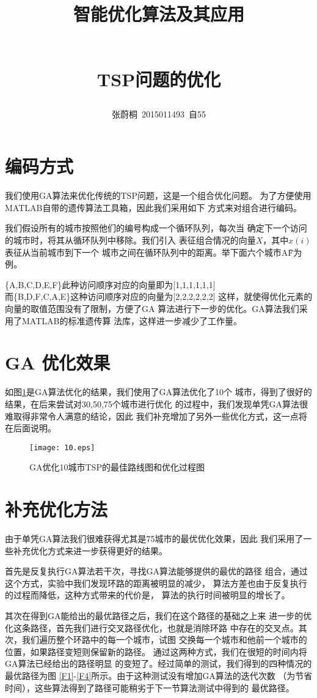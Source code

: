\documentclass[UTF8,a4paper]{paper}
\title{\begin{large} 智能优化算法及其应用\end{large}
\\ TSP问题的优化}
\author{张蔚桐\ 2015011493\ 自55}
\begin{document}
\maketitle
\section{编码方式}
我们使用GA算法来优化传统的TSP问题，这是一个组合优化问题。
为了方便使用MATLAB自带的遗传算法工具箱，因此我们采用如下
方式来对组合进行编码。

我们假设所有的城市按照他们的编号构成一个循环队列，每次当
确定下一个访问的城市时，将其从循环队列中移除。我们引入
表征组合情况的向量$X$，其中$x(i)$表征从当前城市到下一个
城市之间在循环队列中的距离。举下面六个城市A\~F为例。

\{A,B,C,D,E,F\}此种访问顺序对应的向量即为[1,1,1,1,1,1]\\ 
而\{B,D,F,C,A,E\}这种访问顺序对应的向量为[2,2,2,2,2,2]
这样，就使得优化元素的向量的取值范围没有了限制，方便了GA
算法进行下一步的优化。GA算法我们采用了MATLAB的标准遗传算
法库，这样进一步减少了工作量。

\section{GA 优化效果}
如图\ref{F}是GA算法优化的结果，我们使用了GA算法优化了10个
城市，得到了很好的结果，在后来尝试对30,50,75个城市进行优化
的过程中，我们发现单凭GA算法很难取得非常令人满意的结论，因此
我们补充增加了另外一些优化方式，这一点将在后面说明。
\begin{figure}\centering
\texttt{[image: 10.eps]}
\caption{GA优化10城市TSP的最佳路线图和优化过程图}
\label{F}\end{figure}

\section{补充优化方法}
由于单凭GA算法我们很难获得尤其是75城市的最优优化效果，因此
我们采用了一些补充优化方式来进一步获得更好的结果。

首先是反复执行GA算法若干次，寻找GA算法能够提供的最优的路径
组合，通过这个方式，实验中我们发现环路的距离被明显的减少，
算法方差也由于反复执行的过程而降低，这种方式带来的代价是，
算法的执行时间被明显的增长了。

其次在得到GA能给出的最优路径之后，我们在这个路径的基础之上来
进一步的优化这条路径，首先我们进行交叉路径优化，也就是消除环路
中存在的交叉点。其次，我们遍历整个环路中的每一个城市，试图
交换每一个城市和他前一个城市的位置，如果路径变短则保留新的路径。
通过这两种方式，我们在很短的时间内将GA算法已经给出的路径明显
的变短了。经过简单的测试，我们得到的四种情况的最优路径为图
\ref{F1}-\ref{F4}所示。由于这种测试没有增加GA算法的迭代次数
（为节省时间），这些算法得到了路径可能稍劣于下一节算法测试中得到的
最优路径。
\end{document}
